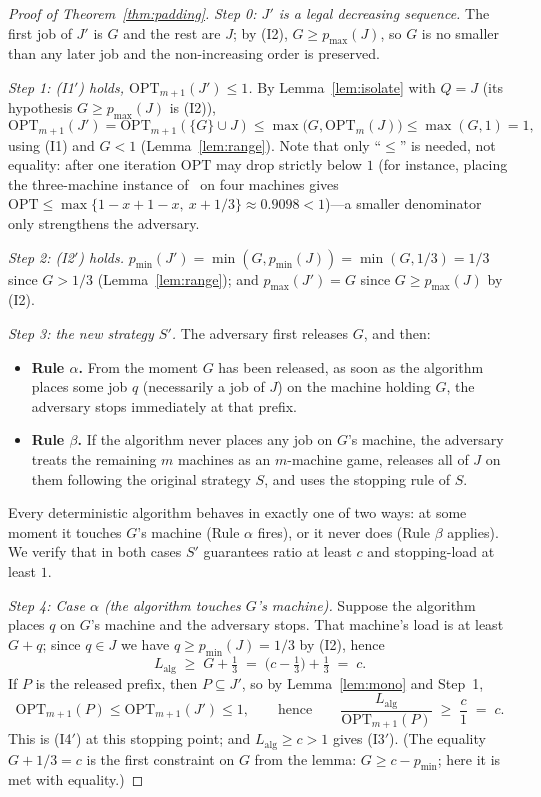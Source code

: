 \documentclass[11pt]{article}
\theoremstyle{definition}
\newcommand{\opt}{\mathrm{OPT}}
\newcommand{\alg}{\mathrm{alg}}
\begin{document}
\begin{proof}[Proof of Theorem~\ref{thm:padding}]
\emph{Step 0: $J'$ is a legal decreasing sequence.}
The first job of $J'$ is $G$ and the rest are $J$; by (I2),
$G\ge p_{\max}(J)$, so $G$ is no smaller than any later job and the
non-increasing order is preserved.

\emph{Step 1: (I1$'$) holds, $\opt_{m+1}(J')\le 1$.}
By Lemma~\ref{lem:isolate} with $Q=J$ (its hypothesis $G\ge p_{\max}(J)$ is
(I2)),
\[
\opt_{m+1}(J')=\opt_{m+1}(\{G\}\cup J)
 \le \max\bigl(G,\opt_{m}(J)\bigr)
 \le \max(G,1)=1,
\]
using (I1) and $G<1$ (Lemma~\ref{lem:range}). Note that only ``$\le$'' is
needed, not equality: after one iteration $\opt$ may drop strictly below $1$
(for instance, placing the three-machine instance of~\cite{SSW00} on four
machines gives $\opt\le\max\{1-x+1-x,\ x+1/3\}\approx0.9098<1$)---a smaller
denominator only strengthens the adversary.

\emph{Step 2: (I2$'$) holds.}
$p_{\min}(J')=\min(G,p_{\min}(J))=\min(G,1/3)=1/3$ since $G>1/3$
(Lemma~\ref{lem:range}); and $p_{\max}(J')=G$ since $G\ge p_{\max}(J)$ by
(I2).

\emph{Step 3: the new strategy $S'$.}
The adversary first releases $G$, and then:
\begin{itemize}
\item \textbf{Rule $\alpha$.} From the moment $G$ has been released, as soon
as the algorithm places some job $q$ (necessarily a job of $J$) on the
machine holding $G$, the adversary stops immediately at that prefix.
\item \textbf{Rule $\beta$.} If the algorithm never places any job on $G$'s
machine, the adversary treats the remaining $m$ machines as an $m$-machine
game, releases all of $J$ on them following the original strategy $S$, and
uses the stopping rule of $S$.
\end{itemize}
Every deterministic algorithm behaves in exactly one of two ways: at some
moment it touches $G$'s machine (Rule $\alpha$ fires), or it never does
(Rule $\beta$ applies). We verify that in both cases $S'$ guarantees ratio
at least $c$ and stopping-load at least $1$.

\emph{Step 4: Case $\alpha$ (the algorithm touches $G$'s machine).}
Suppose the algorithm places $q$ on $G$'s machine and the adversary stops.
That machine's load is at least $G+q$; since $q\in J$ we have
$q\ge p_{\min}(J)=1/3$ by (I2), hence
\[
L_{\alg}\;\ge\;G+\tfrac13\;=\;\bigl(c-\tfrac13\bigr)+\tfrac13\;=\;c .
\]
If $P$ is the released prefix, then $P\subseteq J'$, so by
Lemma~\ref{lem:mono} and Step~1,
\[
\opt_{m+1}(P)\le\opt_{m+1}(J')\le 1,
\qquad\text{hence}\qquad
\frac{L_{\alg}}{\opt_{m+1}(P)}\;\ge\;\frac{c}{1}\;=\;c .
\]
This is (I4$'$) at this stopping point; and $L_{\alg}\ge c>1$ gives (I3$'$).
(The equality $G+1/3=c$ is the first constraint on $G$ from the lemma:
$G\ge c-p_{\min}$; here it is met with equality.)


\end{proof}
\end{document}
